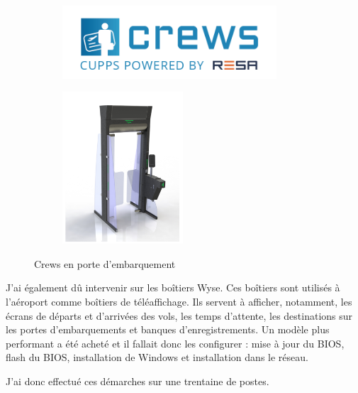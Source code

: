 \begin{figure}[hbt!]
  \begin{subfigure}{0.5\textwidth}
    \centering
    \includegraphics[width=8cm]{Images/logocrews.png}  
    \label{fig:logocrews}
  \end{subfigure}
  \begin{subfigure}{0.5\textwidth}
    \centering
    \includegraphics[width=4.5cm]{Images/crews2.png}\newline  
    \label{fig:portecrews}
  \end{subfigure}
  \caption{Crews en porte d'embarquement}
\end{figure}


J’ai également dû intervenir sur les boîtiers Wyse. Ces boîtiers sont utilisés à l’aéroport comme boîtiers de téléaffichage. Ils servent à afficher, notamment, les écrans de départs et d’arrivées des vols, les temps d’attente, les destinations sur les portes d’embarquements et banques d'enregistrements. Un modèle plus performant a été acheté et il fallait donc les configurer : mise à jour du BIOS, flash du BIOS, installation de Windows et installation dans le réseau.


J’ai donc effectué ces démarches sur une trentaine de postes.\newline

